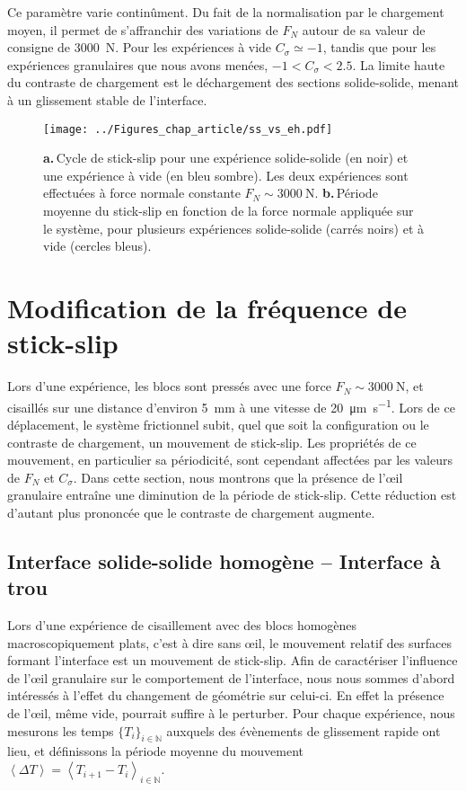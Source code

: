 Ce paramètre varie continûment. Du fait de la normalisation par le chargement moyen, il permet de s'affranchir des variations de $F_N$ autour de sa valeur de consigne de \SI{3000}{\newton}. Pour les expériences à vide $C_\sigma\simeq-1$, tandis que pour les expériences granulaires que nous avons menées, $-1<C_\sigma<2.5$. La limite haute du contraste de chargement est le déchargement des sections solide-solide, menant à un glissement stable de l'interface.


\begin{figure}[h!]
\centering
\texttt{[image: ../Figures\_chap\_article/ss\_vs\_eh.pdf]}
\caption[Comparaison interface homogène -- œil à vide]{\textbf{a.}\,Cycle de stick-slip pour une expérience solide-solide (en noir) et une expérience à vide (en bleu sombre). Les deux expériences sont effectuées à force normale constante $F_N\sim\SI{3000}{\newton}$. \textbf{b.}\,Période moyenne du stick-slip en fonction de la force normale appliquée sur le système, pour plusieurs expériences solide-solide (carrés noirs) et à vide (cercles bleus).}
\label{fig:comparsolidempty}
\end{figure}



\section{Modification de la fréquence de stick-slip}
\label{sec:modiffreq}

Lors d'une expérience, les blocs sont pressés avec une force $F_N \sim \SI{3000}{\newton}$, et cisaillés sur une distance d'environ \SI{5}{\milli\meter} à une vitesse de \SI{20}{\micro\meter\per\second}. Lors de ce déplacement, le système frictionnel subit, quel que soit la configuration ou le contraste de chargement, un mouvement de stick-slip. Les propriétés de ce mouvement, en particulier sa périodicité, sont cependant affectées par les valeurs de $F_N$ et $C_\sigma$. Dans cette section, nous montrons que la présence de l'œil granulaire entraîne une diminution de la période de stick-slip. Cette réduction est d'autant plus prononcée que le contraste de chargement augmente.


\subsection{Interface solide-solide homogène -- Interface à trou}


Lors d'une expérience de cisaillement avec des blocs homogènes macroscopiquement plats, c'est à dire sans œil, le mouvement relatif des surfaces formant l'interface est un mouvement de stick-slip. Afin de caractériser l'influence de l'œil granulaire sur le comportement de l'interface, nous nous sommes d'abord intéressés à l'effet du changement de géométrie sur celui-ci. En effet la présence de l'œil, même vide, pourrait suffire à le perturber. Pour chaque expérience, nous mesurons les temps $\{T_i\}_{i\in\mathbb{N}}$ auxquels des évènements de glissement rapide ont lieu, et définissons la période moyenne du mouvement $\left\langle\Delta T\right\rangle = \left\langle T_{i+1}-T_i\right\rangle_{i\in\mathbb{N}}$.

